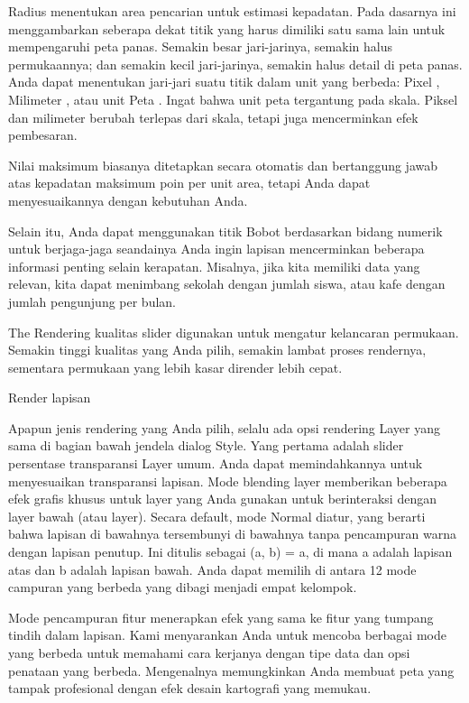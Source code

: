 \documentclass[]{book}
\begin{document}
Radius menentukan area pencarian untuk estimasi kepadatan. Pada dasarnya ini menggambarkan seberapa dekat titik yang harus dimiliki satu sama lain untuk mempengaruhi peta panas. Semakin besar jari-jarinya, semakin halus permukaannya; dan semakin kecil jari-jarinya, semakin halus detail di peta panas. Anda dapat menentukan jari-jari suatu titik dalam unit yang berbeda: Pixel , Milimeter , atau unit Peta . Ingat bahwa unit peta tergantung pada skala. Piksel dan milimeter berubah terlepas dari skala, tetapi juga mencerminkan efek pembesaran.

Nilai maksimum biasanya ditetapkan secara otomatis dan bertanggung jawab atas kepadatan maksimum poin per unit area, tetapi Anda dapat menyesuaikannya dengan kebutuhan Anda.

Selain itu, Anda dapat menggunakan titik Bobot berdasarkan bidang numerik untuk berjaga-jaga seandainya Anda ingin lapisan mencerminkan beberapa informasi penting selain kerapatan. Misalnya, jika kita memiliki data yang relevan, kita dapat menimbang sekolah dengan jumlah siswa, atau kafe dengan jumlah pengunjung per bulan.

The Rendering kualitas slider digunakan untuk mengatur kelancaran permukaan. Semakin tinggi kualitas yang Anda pilih, semakin lambat proses rendernya, sementara permukaan yang lebih kasar dirender lebih cepat.

Render lapisan

Apapun jenis rendering yang Anda pilih, selalu ada opsi rendering Layer yang sama di bagian bawah jendela dialog Style. Yang pertama adalah slider persentase transparansi Layer umum. Anda dapat memindahkannya untuk menyesuaikan transparansi lapisan. Mode blending layer memberikan beberapa efek grafis khusus untuk layer yang Anda gunakan untuk berinteraksi dengan layer bawah (atau layer). Secara default, mode Normal diatur, yang berarti bahwa lapisan di bawahnya tersembunyi di bawahnya tanpa pencampuran warna dengan lapisan penutup. Ini ditulis sebagai (a, b) = a, di mana a adalah lapisan atas dan b adalah lapisan bawah. Anda dapat memilih di antara 12 mode campuran yang berbeda yang dibagi menjadi empat kelompok.

Mode pencampuran fitur menerapkan efek yang sama ke fitur yang tumpang tindih dalam lapisan. Kami menyarankan Anda untuk mencoba berbagai mode yang berbeda untuk memahami cara kerjanya dengan tipe data dan opsi penataan yang berbeda. Mengenalnya memungkinkan Anda membuat peta yang tampak profesional dengan efek desain kartografi yang memukau.
\end{document}
